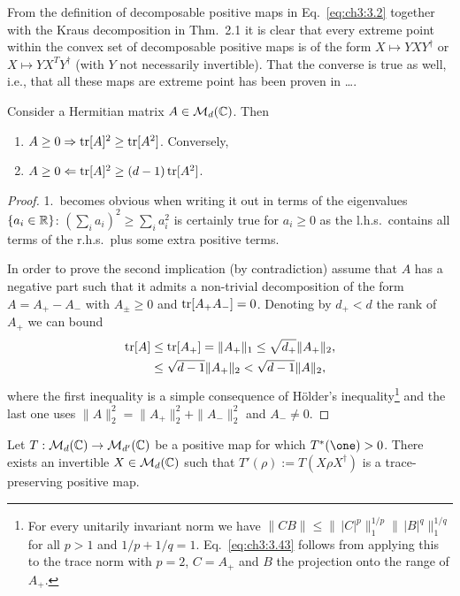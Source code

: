 \documentclass[11pt,a4paper]{article}
\numberwithin{equation}{section}
\begin{document}
From the definition of decomposable positive maps in Eq.~\eqref{eq:ch3:3.2} together with the Kraus decomposition in
Thm.~2.1 it is clear that every extreme point within the convex set of decomposable positive maps is of the form
$X\mapsto YXY^\dagger$ or $X\mapsto YX^T Y^\dagger$ (with $Y$ not necessarily invertible). That the converse is true as
well, i.e., that all these maps are extreme point has been proven in \dots.

\begin{proposition}
    Consider a Hermitian matrix $A\in \mathcal{M}_d(\mathbb{C})$. Then
    \begin{enumerate}
        \item $A\ge 0 \Rightarrow \operatorname{tr}[A]^2 \ge \operatorname{tr}[A^2]$. Conversely,
        \item $A\ge 0 \Leftarrow \operatorname{tr}[A]^2 \ge (d-1)\operatorname{tr}[A^2]$.
    \end{enumerate}
\end{proposition}

\begin{proof}
    1.\ becomes obvious when writing it out in terms of the eigenvalues $\{a_i\in \mathbb{R}\}$:
    $(\sum_i a_i)^2\ge \sum_i a_i^2$ is certainly true for $a_i\ge 0$ as the l.h.s.\ contains all terms of the r.h.s.\ plus
    some extra positive terms.

    In order to prove the second implication (by contradiction) assume that $A$ has a negative part such that it admits a
    non-trivial decomposition of the form $A=A_+-A_-$ with $A_\pm\ge 0$ and $\operatorname{tr}[A_+A_-]=0$. Denoting by $d_+<d$ the rank
    of $A_+$ we can bound
    \begin{align}
        \operatorname{tr}[A] &\le \operatorname{tr}[A_+] = \|A_+\|_1 \le \sqrt{d_+} \|A_+\|_2,
        \label{eq:ch3:3.43}
        \\
               &\le \sqrt{d-1} \|A_+\|_2 < \sqrt{d-1} \|A\|_2,
        \label{eq:ch3:3.44}
    \end{align}
    where the first inequality is a simple consequence of H\"older's inequality\footnote{For every unitarily invariant
        norm we have $\|CB\|\le \|\,|C|^{p}\|_1^{1/p}\|\,|B|^{q}\|_1^{1/q}$ for all $p>1$ and $1/p+1/q=1$.
        Eq.~\eqref{eq:ch3:3.43} follows from applying this to the trace norm with $p=2$, $C=A_+$ and $B$ the projection onto the
        range of $A_+$.} and the last one uses $\|A\|_2^2=\|A_+\|_2^2+\|A_-\|_2^2$ and $A_-\neq 0$.
\end{proof}

\begin{lemma}
    Let $T:\mathcal{M}_d(\mathbb{C})\to \mathcal{M}_{d'}(\mathbb{C})$ be a positive map for which $T^*(\one)>0$. There exists an invertible
    $X\in \mathcal{M}_d(\mathbb{C})$ such that $T'(\rho):=T(X\rho X^\dagger)$ is a trace-preserving positive map.
\end{lemma}
\end{document}
